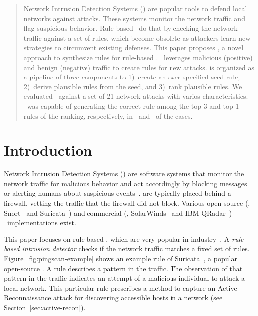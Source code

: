\documentclass[conference]{IEEEtran}
\begin{document}
\pagestyle{plain}
\maketitle


\begin{abstract}
Network Intrusion Detection Systems (\nids{}) are popular tools to
defend local networks against attacks. These systems monitor the
network traffic and flag suspicious behavior. Rule-based \nids\ do
that by checking the network traffic against a set of rules, which
become obsolete as attackers learn new strategies to circumvent
existing defenses. This paper proposes \tname{}, a novel approach to
synthesize rules for rule-based \nids. \tname\ leverages malicious
(positive) and benign (negative) traffic to create rules for new
attacks. \tname{} is organized as a pipeline of three components to
1)~create an over-specified seed rule, 2)~derive plausible rules from
the seed, and 3)~rank plausible rules. We evaluated \tname\ against a
set of 21 network attacks with varios
characteristics. \tname\ was capable of generating the correct rule 
among the top-3 and top-1 rules of the ranking, respectively, in 
\percTopThreeRankingPrefix\ and \percTopOneRankingPrefix\ of the cases.
\end{abstract}


\section{Introduction}
\label{sec:intro}

Network Intrusion Detection Systems (\nids{}) are software systems
that monitor the network traffic for malicious behavior and act
accordingly by blocking messages or alerting humans about suspicious
events~\cite{Mitchell:2014:SID:2597757.2542049}. \nids{} are typically
placed behind a firewall, vetting the traffic that the firewall did
not block. Various open-source (\eg{}, Snort~\cite{snort} and
Suricata~\cite{suricata}) and commercial (\eg{},
SolarWinds~\cite{solarwinds} and IBM QRadar~\cite{qradar})
\nids\ implementations exist.


This paper focuses on rule-based \nids{}, which are very popular in
industry~\cite{proofpoint-etpro,snort-rule-subscriptions}. A
\emph{rule-based intrusion detector} checks if the network traffic matches a fixed
set of rules. Figure~\ref{fig:pingscan-example} shows an example rule
of Suricata~\cite{suricata}, a popular open-source \nids{}. A rule
describes a pattern in the traffic. The observation of that pattern in
the traffic indicates an attempt of a malicious individual
to attack a local network. This particular rule prescribes a method to
capture an Active Reconnaissance attack for discovering accessible
hosts in a network (see Section~\ref{sec:active-recon}).
\end{document}
